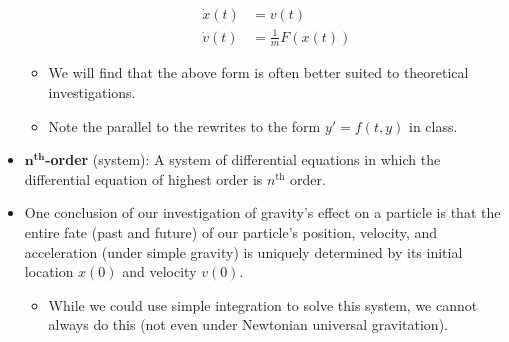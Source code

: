 \documentclass[../notes.tex]{subfiles}
\begin{document}
\begin{itemize}
\begin{itemize}
        \begin{align*}
            \dot{x}(t) &= v(t)\\
            \dot{v}(t) &= \frac{1}{m}F(x(t))
        \end{align*}
        \item We will find that the above form is often better suited to theoretical investigations.
        \item Note the parallel to the rewrites to the form $y'=f(t,y)$ in class.
    \end{itemize}
    \item \textbf{$\bm{n}^\textbf{th}$-order} (system): A system of differential equations in which the differential equation of highest order is $n^\text{th}$ order.
    \item One conclusion of our investigation of gravity's effect on a particle is that the entire fate (past and future) of our particle's position, velocity, and acceleration (under simple gravity) is uniquely determined by its initial location $x(0)$ and velocity $v(0)$.
    \begin{itemize}
        \item While we could use simple integration to solve this system, we cannot always do this (not even under Newtonian universal gravitation).
    \end{itemize}
\end{itemize}
\end{document}
